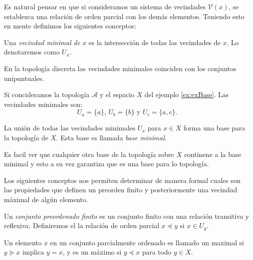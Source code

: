 Es natural pensar en que si consideramos un sistema de vecindades $\mathcal{V}(x)$, se establezca una relación de orden parcial con los demás elementos. Teniendo esto en mente definimos los siguientes conceptos:

\begin{definition}\label{def:vecindadMinimal}
Una \textit{vecindad minimal de} $x$ es la intersección de todas las vecindades de $x$. Lo denotaremos como $U_x$.
\end{definition}

\begin{example}\label{ex:vecindadMinimalEnUnipuntuales}
En la topología discreta las vecindades minimales coinciden con los conjuntos unipuntuales.
\end{example}

\begin{example}\label{ex:minimalesExBase}
Si concideramos la topología $\mathcal{A}$ y el espacio $X$ del ejemplo \ref{ex:exBase}. Las vecindades minimales son:
$$U_a = \{a\}\text{, }U_b = \{b\}\text{ y }U_c=\{a,c\}.$$
\end{example}

\begin{proposicion}\label{pro:baseMinimal}
La unión de todas las vecindades minimales $U_x$ para $x\in X$ forma una base para la topología de $X$. Esta base es llamada \textit{base minimal}.
\end{proposicion}

Es facil ver que cualquier otra base de la topología sobre $X$ continene a la base minimal y esto a su vez garantiza que es una base para lo topología.

Los siguientes conceptos nos permiten determinar de manera formal cuales son las propiedades que definen un preorden finito y posteriormente una vecindad máximal de algún elemento.

\begin{definition}\label{def:conjuntoPreordenadoFinito}
Un \textit{conjunto preordenado finito} es un conjunto finito con una relación transitiva y reflexiva. Definiremos el la relación de orden parcial $x\preceq y$ si $x\in U_y$.
\end{definition}

\begin{definition}\label{def:maximal}
Un elemento $x$ en un conjunto parcialmente ordenado es llamado un maximal si $y\succeq x$ implica $y=x$, y es un máximo si $y\preceq x$ para todo $y\in X$.
\end{definition}

